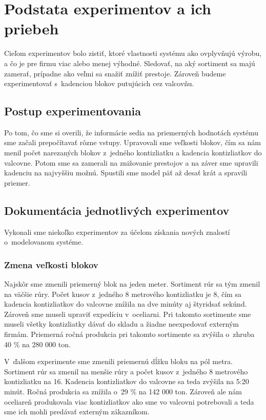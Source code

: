 \documentclass[]{article}
\begin{document}
\section{Podstata experimentov a ich priebeh}
Cieľom experimentov bolo zistiť, ktoré vlastnosti systému ako ovplyvňujú výrobu, a čo je pre firmu viac alebo menej výhodné. Sledovať, na aký sortiment sa majú zamerať, prípadne ako veľmi sa snažiť znížiť prestoje. Zároveň budeme experimentovať s~kadenciou blokov putujúcich cez valcovňu.

\subsection{Postup experimentovania}
Po tom, čo sme si overili, že informácie sedia na priemerných hodnotách systému sme začali prepočítavať rôzne vstupy. Upravovali sme veľkosti blokov, čím sa nám menil počet narezaných blokov z~jedného kontizliatku a kadencia kontizliatkov do valcovne. Potom sme sa zamerali na znižovanie prestojov a na záver sme upravili kadenciu na najvyššiu možnú. Spustili sme model päť až desať krát a spravili priemer.

\subsection{Dokumentácia jednotlivých experimentov}
Vykonali sme niekoľko experimentov za účelom získania nových znalostí o~modelovanom systéme.

\subsubsection{Zmena veľkosti blokov}
Najskôr sme zmenili priemerný blok na jeden meter. Sortiment rúr sa tým zmenil na väčšie rúry. Počet kusov z~jedného 8 metrového kontizliatku je 8, čím sa kadencia kontizliatkov do valcovne znížila na dve minúty aj štyridsať sekúnd. Zároveň sme museli upraviť expedíciu v~oceliarni. Pri takomto sortimente sme museli všetky kontizliatky dávať do skladu a žiadne neexpedovať externým firmám. Priemerná ročná produkcia pri takomto sortimente sa zvýšila o~zhruba 40 \% na 280 000 ton.

V~ďalšom experimente sme zmenili priemernú dĺžku bloku na pól metra. Sortiment rúr sa zmenil na menšie rúry a počet kusov z~jedného 8 metrového kontizliatku na 16. Kadencia kontizliatkov do valcovne sa teda zvýšila na 5:20 minút. Ročná produkcia sa znížila o~29 \% na 142 000 ton. Zároveň ale nám oceliareň produkovala viac kontizliatkov ako sme vo valcovni potrebovali a teda sme ich mohli predávať externým zákazníkom.
\end{document}
